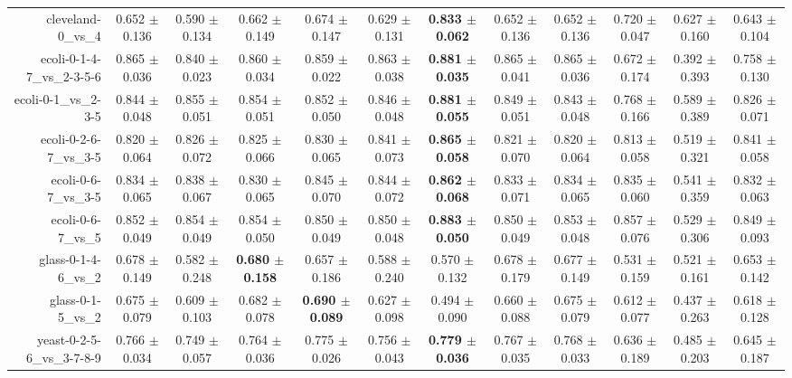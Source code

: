 \begin{table}[!ht]
{\begin{tabular}{r c c c c c c c c c c c}
cleveland-0\_vs\_4 & 0.652 $\pm$ 0.136 & 0.590 $\pm$ 0.134 & 0.662 $\pm$ 0.149 & 0.674 $\pm$ 0.147 & 0.629 $\pm$ 0.131 & \textbf{0.833 $\pm$ 0.062} & 0.652 $\pm$ 0.136 & 0.652 $\pm$ 0.136 & 0.720 $\pm$ 0.047 & 0.627 $\pm$ 0.160 & 0.643 $\pm$ 0.104 \\
ecoli-0-1-4-7\_vs\_2-3-5-6 & 0.865 $\pm$ 0.036 & 0.840 $\pm$ 0.023 & 0.860 $\pm$ 0.034 & 0.859 $\pm$ 0.022 & 0.863 $\pm$ 0.038 & \textbf{0.881 $\pm$ 0.035} & 0.865 $\pm$ 0.041 & 0.865 $\pm$ 0.036 & 0.672 $\pm$ 0.174 & 0.392 $\pm$ 0.393 & 0.758 $\pm$ 0.130 \\
ecoli-0-1\_vs\_2-3-5 & 0.844 $\pm$ 0.048 & 0.855 $\pm$ 0.051 & 0.854 $\pm$ 0.051 & 0.852 $\pm$ 0.050 & 0.846 $\pm$ 0.048 & \textbf{0.881 $\pm$ 0.055} & 0.849 $\pm$ 0.051 & 0.843 $\pm$ 0.048 & 0.768 $\pm$ 0.166 & 0.589 $\pm$ 0.389 & 0.826 $\pm$ 0.071 \\
ecoli-0-2-6-7\_vs\_3-5 & 0.820 $\pm$ 0.064 & 0.826 $\pm$ 0.072 & 0.825 $\pm$ 0.066 & 0.830 $\pm$ 0.065 & 0.841 $\pm$ 0.073 & \textbf{0.865 $\pm$ 0.058} & 0.821 $\pm$ 0.070 & 0.820 $\pm$ 0.064 & 0.813 $\pm$ 0.058 & 0.519 $\pm$ 0.321 & 0.841 $\pm$ 0.058 \\
ecoli-0-6-7\_vs\_3-5 & 0.834 $\pm$ 0.065 & 0.838 $\pm$ 0.067 & 0.830 $\pm$ 0.065 & 0.845 $\pm$ 0.070 & 0.844 $\pm$ 0.072 & \textbf{0.862 $\pm$ 0.068} & 0.833 $\pm$ 0.071 & 0.834 $\pm$ 0.065 & 0.835 $\pm$ 0.060 & 0.541 $\pm$ 0.359 & 0.832 $\pm$ 0.063 \\
ecoli-0-6-7\_vs\_5 & 0.852 $\pm$ 0.049 & 0.854 $\pm$ 0.049 & 0.854 $\pm$ 0.050 & 0.850 $\pm$ 0.049 & 0.850 $\pm$ 0.048 & \textbf{0.883 $\pm$ 0.050} & 0.850 $\pm$ 0.049 & 0.853 $\pm$ 0.048 & 0.857 $\pm$ 0.076 & 0.529 $\pm$ 0.306 & 0.849 $\pm$ 0.093 \\
glass-0-1-4-6\_vs\_2 & 0.678 $\pm$ 0.149 & 0.582 $\pm$ 0.248 & \textbf{0.680 $\pm$ 0.158} & 0.657 $\pm$ 0.186 & 0.588 $\pm$ 0.240 & 0.570 $\pm$ 0.132 & 0.678 $\pm$ 0.179 & 0.677 $\pm$ 0.149 & 0.531 $\pm$ 0.159 & 0.521 $\pm$ 0.161 & 0.653 $\pm$ 0.142 \\
glass-0-1-5\_vs\_2 & 0.675 $\pm$ 0.079 & 0.609 $\pm$ 0.103 & 0.682 $\pm$ 0.078 & \textbf{0.690 $\pm$ 0.089} & 0.627 $\pm$ 0.098 & 0.494 $\pm$ 0.090 & 0.660 $\pm$ 0.088 & 0.675 $\pm$ 0.079 & 0.612 $\pm$ 0.077 & 0.437 $\pm$ 0.263 & 0.618 $\pm$ 0.128 \\
yeast-0-2-5-6\_vs\_3-7-8-9 & 0.766 $\pm$ 0.034 & 0.749 $\pm$ 0.057 & 0.764 $\pm$ 0.036 & 0.775 $\pm$ 0.026 & 0.756 $\pm$ 0.043 & \textbf{0.779 $\pm$ 0.036} & 0.767 $\pm$ 0.035 & 0.768 $\pm$ 0.033 & 0.636 $\pm$ 0.189 & 0.485 $\pm$ 0.203 & 0.645 $\pm$ 0.187 \\

\end{tabular}}
\end{table}
